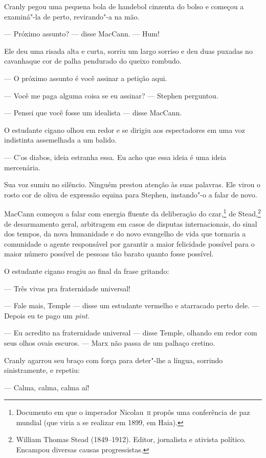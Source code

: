 Cranly pegou uma pequena bola de handebol cinzenta do bolso e
começou a examiná"-la de perto, revirando"-a na mão.

 --- Próximo assunto? --- disse MacCann. --- Hum!

Ele deu uma risada alta e curta, sorriu um largo sorriso e deu duas
puxadas no cavanhaque cor de palha pendurado do queixo rombudo.

 --- O próximo assunto é você assinar a petição aqui.

 --- Você me paga alguma coisa se eu assinar? --- Stephen perguntou.

 --- Pensei que você fosse um idealista --- disse MacCann.

O estudante cigano olhou em redor e se dirigiu aos espectadores em uma
voz indistinta assemelhada a um balido.

 --- C’os diabos, ideia estranha essa. Eu acho que essa ideia é uma ideia
mercenária.

Sua voz sumiu no silêncio. Ninguém prestou atenção às suas palavras. Ele
virou o rosto cor de oliva de expressão equina para Stephen, instando"-o
a falar de novo.

MacCann começou a falar com energia fluente da deliberação do
czar,\footnote{ Documento em que o imperador Nicolau~\textsc{ii} propôs
uma conferência de paz mundial (que viria a se realizar em 1899, em
Haia).} de Stead,\footnote{ William Thomas Stead (1849--1912). Editor,
jornalista e ativista político. Encampou diversas causas
progressistas.} de desarmamento geral, arbitragem em casos de disputas
internacionais, do sinal dos tempos, da nova humanidade e do novo
evangelho de vida que tornaria a comunidade o agente responsável por
garantir a maior felicidade possível para o maior número possível de
pessoas tão barato quanto fosse possível.

O estudante cigano reagiu ao final da frase gritando:

 --- Três vivas pra fraternidade universal!

 --- Fale mais, Temple --- disse um estudante vermelho e atarracado perto
dele. --- Depois eu te pago um \textit{pint}.

 --- Eu acredito na fraternidade universal --- disse Temple, olhando em redor
com seus olhos ovais escuros. --- Marx não passa de um palhaço cretino.

Cranly agarrou seu braço com força para deter"-lhe a língua, sorrindo
sinistramente, e repetiu:

 --- Calma, calma, calma aí!

